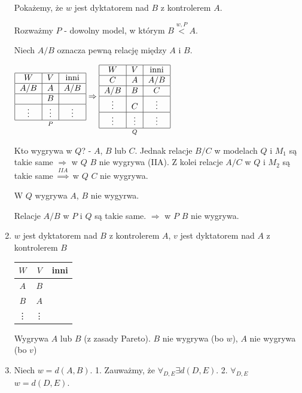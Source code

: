 \documentclass[12pt,a4paper]{article}
\theoremstyle{break}
\begin{document}
\begin{enumerate}[Dow. I)]
			Pokażemy, że $w$ jest dyktatorem nad $B$ z kontrolerem $A$.
			
			Rozważmy $P$ - dowolny model, w którym $B\overset{w,P}{<}A$. 
			
			Niech $A/B$ oznacza pewną relację między $A$ i $B$.
			
			$\underset{P}{\begin{tabular}{|c|c|c|}\hline
				$W$ & $V$ & inni \\\hline
				$A/B$ & $A$ & $A/B$ \\\hline
				& $B$ & \\\hline
				\vdots & \vdots & \vdots \\\hline
			\end{tabular}}
			\Rightarrow
			\underset{Q}{\begin{tabular}{|c|c|c|}\hline
				$W$ & $V$ & inni \\\hline
				$C$ & $A$ & $A/B$ \\\hline
				$A/B$ & $B$ & $C$ \\\hline
				\vdots & $C$ & \vdots \\\hline
				\vdots & \vdots & \vdots \\\hline
			\end{tabular}}$
			
						Kto wygrywa w $Q$? - $A$, $B$ lub $C$. Jednak relacje $B/C$ w modelach $Q$ i $M_1$ są takie same $\Rightarrow$ w $Q$ $B$ nie wygrywa (IIA). Z kolei relacje $A/C$ w $Q$ i $M_2$ są takie same $\overset{IIA}{\Rightarrow}$ w $Q$ $C$ nie wygrywa.
			
			W $Q$ wygrywa $A$, $B$ nie wygyrwa.
			
			Relacje $A/B$ w $P$ i $Q$ są takie same. $\Rightarrow$ w $P$ $B$ nie wygrywa.
			\newpage
			\item $w$ jest dyktatorem nad $B$ z kontrolerem $A$, $v$ jest dyktatorem nad $A$ z kontrolerem $B$
			
			\begin{tabular}{|c|c|c|}\hline
				$W$ & $V$ & inni \\\hline
				$A$ & $B$ & \\\hline
				$B$ & $A$ & \\\hline
				\vdots & \vdots & \\\hline
			\end{tabular}
			
			Wygrywa $A$ lub $B$ (z zasady Pareto).
			$B$ nie wygrywa (bo $w$), $A$ nie wygrywa (bo $v$) \faBolt
			\item Niech $w = d(A,B)$.
			1. Zauważmy, że $\forall_{D,E} \exists d(D,E)$.
			2. $\forall_{D,E}$ $w = d(D,E)$.
			

\end{enumerate}
\end{document}
